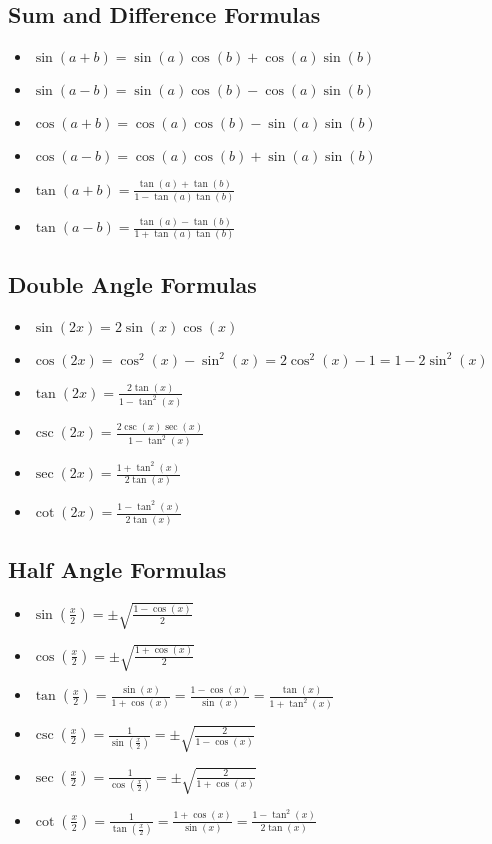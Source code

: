 \subsection{Sum and Difference Formulas}
\begin{itemize}[label=$-$]
    \item \( \sin(a + b) = \sin(a)\cos(b) + \cos(a)\sin(b) \)
    \item \( \sin(a - b) = \sin(a)\cos(b) - \cos(a)\sin(b) \)
    \item \( \cos(a + b) = \cos(a)\cos(b) - \sin(a)\sin(b) \)
    \item \( \cos(a - b) = \cos(a)\cos(b) + \sin(a)\sin(b) \)
    \item \( \tan(a + b) = \frac{\tan(a) + \tan(b)}{1 - \tan(a)\tan(b)}\)
    \item \( \tan(a - b) = \frac{\tan(a) - \tan(b)}{1 + \tan(a)\tan(b)}\)
\end{itemize}

\subsection{Double Angle Formulas}
\begin{itemize}[label=$-$]
    \item \( \sin(2x) = 2\sin(x)\cos(x) \)
    \item \( \cos(2x) = \cos^2(x) - \sin^2(x) = 2\cos^2(x) - 1 = 1 - 2\sin^2(x) \)
    \item \( \tan(2x) = \frac{2\tan(x)}{1 - \tan^2(x)}\)
    \item \( \csc(2x) = \frac{2\csc(x)\sec(x)}{1 - \tan^2(x)}\)
    \item \( \sec(2x) = \frac{1 + \tan^2(x)}{2\tan(x)}\)
    \item \( \cot(2x) = \frac{1 - \tan^2(x)}{2\tan(x)}\)
\end{itemize}

\subsection{Half Angle Formulas}
\begin{itemize}[label=$-$]
    \item \( \sin\left(\frac{x}{2}\right) = \pm\sqrt{\frac{1 - \cos(x)}{2}} \)
    \item \( \cos\left(\frac{x}{2}\right) = \pm\sqrt{\frac{1 + \cos(x)}{2}} \)
    \item \( \tan\left(\frac{x}{2}\right) = \frac{\sin(x)}{1 + \cos(x)} = \frac{1 - \cos(x)}{\sin(x)} = \frac{\tan(x)}{1 + \tan^2(x)}\)
    \item \( \csc\left(\frac{x}{2}\right) = \frac{1}{\sin\left(\frac{x}{2}\right)} = \pm\sqrt{\frac{2}{1 - \cos(x)}} \)
    \item \( \sec\left(\frac{x}{2}\right) = \frac{1}{\cos\left(\frac{x}{2}\right)} = \pm\sqrt{\frac{2}{1 + \cos(x)}} \)
    \item \( \cot\left(\frac{x}{2}\right) = \frac{1}{\tan\left(\frac{x}{2}\right)} = \frac{1 + \cos(x)}{\sin(x)} = \frac{1 - \tan^2(x)}{2\tan(x)}\)
\end{itemize}

